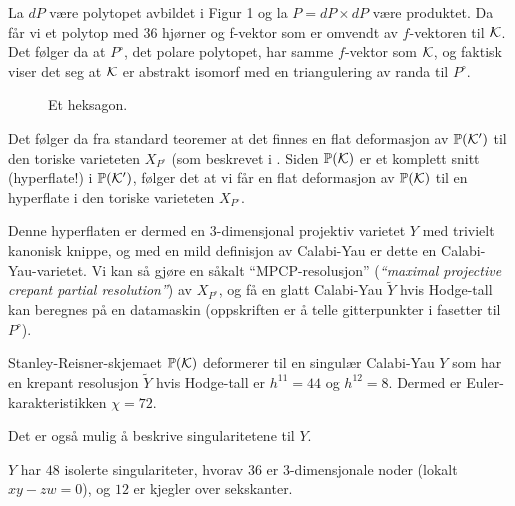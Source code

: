 \documentclass[11pt, norsk]{article}
\begin{document}
La $dP$ være polytopet avbildet i Figur 1 og la $P=dP \times dP$ være produktet. Da får vi et polytop med $36$ hjørner og f-vektor som er omvendt av $f$-vektoren til $\mathcal K$. Det følger da at $P^\circ$, det polare polytopet, har samme $f$-vektor som $\mathcal K$, og faktisk viser det seg at $\mathcal K$ er abstrakt isomorf med en triangulering av randa til $P^\circ$.

\begin{figure}
\label{fig:hexagon}
\centering
{}
\caption{Et heksagon.}
\end{figure}

Det følger da fra standard teoremer at det finnes en flat deformasjon av $\mathbb{P}(\mathcal K')$ til den toriske varieteten $X_{P^\circ}$ (som beskrevet i \cite{sturmfels}. Siden $\mathbb{P}(\mathcal K)$ er et komplett snitt (hyperflate!) i $\mathbb{P}(\mathcal K')$, følger det at vi får en flat deformasjon av $\mathbb{P}(\mathcal K)$ til en hyperflate i den toriske varieteten $X_{P^\circ}$.

Denne hyperflaten er dermed en $3$-dimensjonal projektiv varietet $Y$ med trivielt kanonisk knippe, og med en mild definisjon av Calabi-Yau er dette en Calabi-Yau-varietet. Vi kan så gjøre en såkalt ``MPCP-resolusjon'' (\emph{``maximal projective crepant partial resolution''}) av $X_{P^\circ}$, og få en glatt Calabi-Yau $\widetilde Y$ hvis Hodge-tall kan beregnes på en datamaskin (oppskriften er å telle gitterpunkter i fasetter til $P^\circ$).

\begin{prop}
Stanley-Reisner-skjemaet $\mathbb{P}(\mathcal K)$ deformerer til en singulær Calabi-Yau $Y$ som har en krepant resolusjon $\widetilde Y$ hvis Hodge-tall er $h^{11}=44$ og $h^{12}=8$. Dermed er Euler-karakteristikken $\chi=72$.
\end{prop}

Det er også mulig å beskrive singularitetene til $Y$.

\begin{prop}
$Y$ har $48$ isolerte singulariteter, hvorav $36$ er $3$-dimensjonale noder (lokalt $xy-zw=0$), og $12$ er kjegler over sekskanter.
\end{prop}
\end{document}
